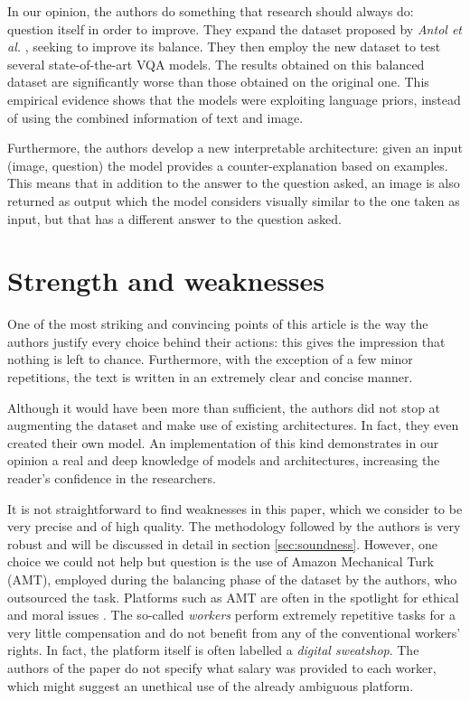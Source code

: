 \documentclass[letterpaper,11pt]{article}
\begin{document}
In our opinion, the authors do something that research should always do: question itself in order to improve. They expand the dataset proposed by \textit{Antol et al.} \cite{antol2015vqa}, seeking to improve its balance. They then employ the new dataset to test several state-of-the-art VQA models. The results obtained on this balanced dataset are significantly worse than those obtained on the original one. This empirical evidence shows that the models were exploiting language priors, instead of using the combined information of text and image. 

Furthermore, the authors develop a new interpretable architecture: given an input (image, question) the model provides a counter-explanation based on examples. This means that in addition to the answer to the question asked, an image is also returned as output which the model considers visually similar to the one taken as input, but that has a different answer to the question asked.


\section{Strength and weaknesses}
\label{sec:procons}

One of the most striking and convincing points of this article is the way the authors justify every choice behind their actions: this gives the impression that nothing is left to chance. Furthermore, with the exception of a few minor repetitions, the text is written in an extremely clear and concise manner.

Although it would have been more than sufficient, the authors did not stop at augmenting the dataset and make use of existing architectures. In fact, they even created their own model. An implementation of this kind demonstrates in our opinion a real and deep knowledge of models and architectures, increasing the reader's confidence in the researchers.

It is not straightforward to find weaknesses in this paper, which we consider to be very precise and of high quality. The methodology followed by the authors is very robust and will be discussed in detail in section \ref{sec:soundness}. However, one choice we could not help but question is the use of Amazon Mechanical Turk (AMT), employed during the balancing phase of the dataset by the authors, who outsourced the task. Platforms such as AMT are often in the spotlight for ethical and moral issues \cite{fort2011amazon}. The so-called \textit{workers} perform extremely repetitive tasks for a very little compensation and do not benefit from any of the conventional workers' rights. In fact, the platform itself is often labelled a \textit{digital sweatshop}. The authors of the paper do not specify what salary was provided to each worker, which might suggest an unethical use of the already ambiguous platform.
\end{document}
